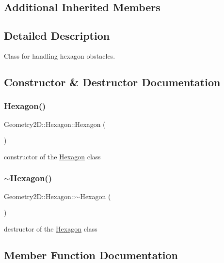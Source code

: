 \subsection*{Additional Inherited Members}


\subsection{Detailed Description}
Class for handling hexagon obstacles. 

\subsection{Constructor \& Destructor Documentation}
\mbox{\label{class_geometry2_d_1_1_hexagon_a5f151d8d0cb83ff62bb13196a0101a9e}} 
\subsubsection{\texorpdfstring{Hexagon()}{Hexagon()}}
{\footnotesize\ttfamily Geometry2\+D\+::\+Hexagon\+::\+Hexagon (\begin{DoxyParamCaption}{ }\end{DoxyParamCaption})}

constructor of the \mbox{\hyperlink{class_geometry2_d_1_1_hexagon}{Hexagon}} class \mbox{\label{class_geometry2_d_1_1_hexagon_aa16b14ea33395f3ec9ee58208c88eb1b}} 
\subsubsection{\texorpdfstring{$\sim$\+Hexagon()}{~Hexagon()}}
{\footnotesize\ttfamily Geometry2\+D\+::\+Hexagon\+::$\sim$\+Hexagon (\begin{DoxyParamCaption}{ }\end{DoxyParamCaption})}

destructor of the \mbox{\hyperlink{class_geometry2_d_1_1_hexagon}{Hexagon}} class 

\subsection{Member Function Documentation}
\mbox{\label{class_geometry2_d_1_1_hexagon_ad72b9382bd173efc5aad346e7af074a0}} 
